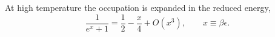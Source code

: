 \documentclass{article}
\begin{document}
At high temperature the occupation is expanded in the reduced energy,
\begin{equation}
\frac{1}{e^{x}+1} = \frac{1}{2} - \frac{x}{4} + O(x^3), \qquad x \equiv \beta\epsilon .
\label{eq:ht}
\end{equation}
\end{document}
